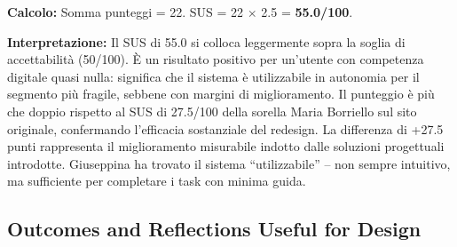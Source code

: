\documentclass[11pt,a4paper]{article}
\begin{document}
\begin{tcolorbox}[colback=backgroundColor,colframe=borderColor,arc=2mm]
\vspace{0.3cm}
\noindent\textbf{Calcolo:} Somma punteggi = 22. SUS = 22 $\times$ 2.5 = \textbf{55.0/100}.

\vspace{0.2cm}
\noindent\textbf{Interpretazione:} Il SUS di 55.0 si colloca leggermente sopra la soglia di accettabilit\`a (50/100). \`E un risultato positivo per un'utente con competenza digitale quasi nulla: significa che il sistema \`e utilizzabile in autonomia per il segmento pi\`u fragile, sebbene con margini di miglioramento. Il punteggio \`e pi\`u che doppio rispetto al SUS di 27.5/100 della sorella Maria Borriello sul sito originale, confermando l'efficacia sostanziale del redesign. La differenza di +27.5 punti rappresenta il miglioramento misurabile indotto dalle soluzioni progettuali introdotte. Giuseppina ha trovato il sistema ``utilizzabile'' -- non sempre intuitivo, ma sufficiente per completare i task con minima guida.

\end{tcolorbox}

\vspace{0.3cm}

\subsection{Outcomes and Reflections Useful for Design}
\end{document}
